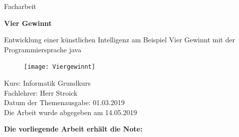 \documentclass[12pt,a4paper]{article}
\begin{document}
	
	\begin{center}
		
		\vspace{30pt}
		
		{\LARGE Facharbeit}\\
		
		\vspace{50pt}
		
		\textbf{{\Huge Vier Gewinnt}}\\
		
		{\large Entwicklung einer künstlichen Intelligenz am Beispiel Vier Gewinnt mit der Programmiersprache java
\begin{figure}[h]
	\centering
	\texttt{[image: Viergewinnt]}
	\label{fig:viergewinnt}
\end{figure}
			
		}
		
		\vspace{90pt}
		
		{\large Kurs: Informatik Grundkurs\\
			
			Fachlehrer: Herr Stroick\\
			
			Datum der Themenausgabe: 01.03.2019\\
			
			Die Arbeit wurde abgegeben am 14.05.2019\\}
		
		\vspace{20pt}
		
		\textbf{{\large Die vorliegende Arbeit erhält die Note:}}
		
	\end{center}
	
	\pagebreak
	\tableofcontents
	\newpage
	\setcounter{page}{2}
\end{document}

